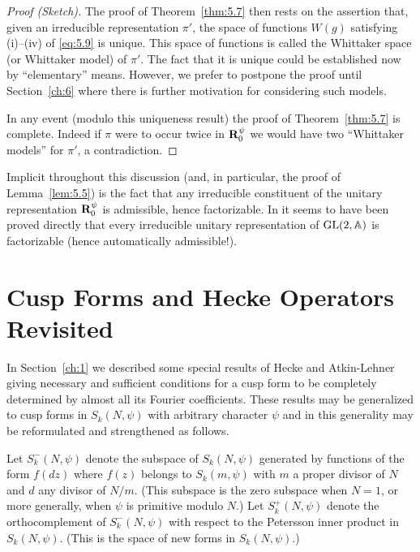 \begin{proof}[Proof (Sketch)]
The proof of Theorem~\ref{thm:5.7} then rests on the assertion that, given an irreducible representation $\pi'$, the space of functions $W(g)$ satisfying (i)--(iv) of \eqref{eq:5.9} is unique. This space of functions is called the Whittaker space (or Whittaker model) of $\pi'$. The fact that it is unique could be established now by ``elementary'' means. However, we prefer to postpone the proof until Section~\ref{ch:6} where there is further motivation for considering such models.

In any event (modulo this uniqueness result) the proof of Theorem~\ref{thm:5.7} is complete. Indeed if $\pi$ were to occur twice in $\mathbf{R}_0^{\psi}$ we would have two ``Whittaker models'' for $\pi'$, a contradiction.

\end{proof}

\begin{remark}\label{rem:5.8}

Implicit throughout this discussion (and, in particular, the proof of Lemma~\ref{lem:5.5}) is the fact that any irreducible constituent of the unitary representation $\mathbf{R}_0^{\psi}$ is admissible, hence factorizable. In \cite{GelfandGraevPyatetskiiShapiro} it seems to have been proved directly that every irreducible unitary representation of $\operatorname{GL}(2,\mathbb{A})$ is factorizable (hence automatically admissible!).

\end{remark}

\section{Cusp Forms and Hecke Operators Revisited}\label{sec:5b}

In Section~\ref{ch:1} we described some special results of Hecke and Atkin-Lehner giving necessary and sufficient conditions for a cusp form to be completely determined by almost all its Fourier coefficients. These results may be generalized to cusp forms in $S_k(N, \psi)$ with arbitrary character $\psi$ and in this generality may be reformulated and strengthened as follows.

Let $S_k^-(N,\psi)$ denote the subspace of $S_k(N,\psi)$ generated by functions of the form $f(dz)$ where $f(z)$ belongs to $S_k(m,\psi)$ with $m$ a proper divisor of $N$ and $d$ any divisor of $N/m$. (This subspace is the zero subspace when $N = 1$, or more generally, when $\psi$ is primitive modulo $N$.) Let $S_k^+(N,\psi)$ denote the orthocomplement of $S_k^-(N,\psi)$ with respect to the Petersson inner product in $S_k(N,\psi)$. (This is the space of new forms in $S_k(N,\psi)$.)

